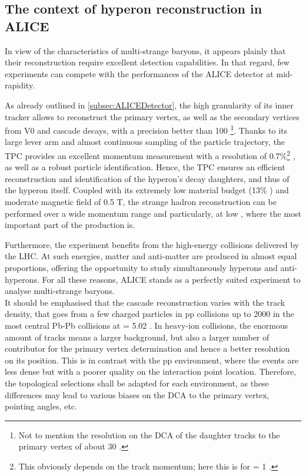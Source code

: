 \subsection{The context of hyperon reconstruction in ALICE}
\label{subsec:HyperonAndALICE}

In view of the characteristics of multi-strange baryons, it appears plainly that their reconstruction require excellent detection capabilities. In that regard, few experiments can compete with the performances of the ALICE detector at mid-rapidity.

As already outlined in \Sec\ref{subsec:ALICEDetector}, the high granularity of its inner tracker allows to reconstruct the primary vertex, as well as the secondary vertices from V0 and cascade decays, with a precision better than 100 \mum\footnote{Not to mention the resolution on the DCA of the daughter tracks to the primary vertex of about 30 \mum \cite{alicecollaborationPerformanceALICEExperiment2014}.}. Thanks to its large lever arm and almost continuous sampling of the particle trajectory, the TPC 
provides an excellent momentum measurement with a resolution of 0.7\%\footnote{This obviously depends on the track momentum; here this is for \pT = 1 \gmom.} \cite{alicecollaborationALICEPhysicsPerformance2006}, as well as a robust particle identification. Hence, the TPC ensures an efficient reconstruction and identification of the hyperon's decay daughters, and thus of the hyperon itself. Coupled with its extremely low material budget (13\% \Xzero) and moderate magnetic field of 0.5 T, the strange hadron reconstruction can be performed over a wide momentum range and particularly, at low \pT, where the most important part of the production is.

Furthermore, the experiment benefits from the high-energy collisions delivered by the LHC. At such energies, matter and anti-matter are produced in almost equal proportions, offering the opportunity to study simultaneously hyperons and anti-hyperons. For all these reasons, ALICE stands as a perfectly suited experiment to analyse multi-strange baryons. \\

It should be emphasised that the cascade reconstruction varies with the track density, that goes from a few charged particles in pp collisions up to 2000 in the most central Pb-Pb collisions at \sqrtSnn = 5.02 \tev \cite{alicecollaborationCentralityDependenceChargedParticle2016}. In heavy-ion collisions, the enormous amount of tracks means a larger background, but also a larger number of contributor for the primary vertex determination and hence a better resolution on its position. This is in contrast with the pp environment, where the events are less dense but with a poorer quality on the interaction point location. Therefore, the topological selections shall be adapted for each environment, as these differences may lead to various biases on the DCA to the primary vertex, pointing angles, etc. 

